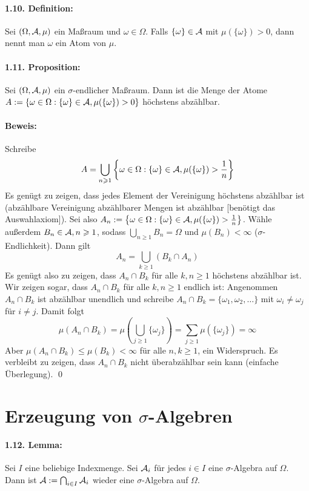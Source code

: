 \paragraph{1.10. Definition:}Sei $(\Omega,\mathcal{A},\mu)$ ein Ma\ss{}raum und $\omega\in\Omega$. Falls $\{\omega\}\in\mathcal{A}$ mit $\mu(\{\omega\})>0$, dann nennt man $\omega$ ein Atom von $\mu$.

\paragraph{1.11. Proposition:}Sei $(\Omega,\mathcal{A},\mu)$ ein $\sigma$-endlicher Ma\ss{}raum. Dann ist die Menge der Atome $A:=\{\omega\in\Omega:\{\omega\}\in\mathcal{A},\mu(\{\omega\})>0\}$ h\"ochstens abz\"ahlbar.

\paragraph{Beweis:}Schreibe
$$A=\bigcup_{n\geqslant1}\left\{\omega\in\Omega:\{\omega\}\in\mathcal{A},\mu(\{\omega\})>\frac{1}{n}\right\}$$
Es gen\"ugt zu zeigen, dass jedes Element der Vereinigung h\"ochstens abz\"ahlbar ist (abz\"ahlbare Vereinigung abz\"ahlbarer Mengen ist abz\"ahlbar [ben\"otigt das Auswahlaxiom]). Sei also $A_n:=\left\{\omega\in\Omega:\{\omega\}\in\mathcal{A},\mu(\{\omega\})>\frac{1}{n}\right\}$. W\"ahle au\ss{}erdem $B_n\in\mathcal{A},n\geqslant1$, sodass $\bigcup_{n\geq1}B_n=\Omega$ und $\mu(B_n)<\infty$ ($\sigma$-Endlichkeit). Dann gilt
$$A_n=\bigcup_{k\geq1}(B_k\cap A_n)$$
Es gen\"ugt also zu zeigen, dass $A_n\cap B_k$ f\"ur alle $k,n\geq1$ h\"ochstens abz\"ahlbar ist. Wir zeigen sogar, dass $A_n\cap B_k$ f\"ur alle $k,n\geq1$ endlich ist:\newline
 Angenommen $A_n\cap B_k$ ist abz\"ahlbar unendlich und schreibe $A_n\cap B_k=\{\omega_1,\omega_2,\hdots\}$ mit $\omega_i\neq\omega_j$ f\"ur $i\neq j$. Damit folgt
 $$\mu(A_n\cap B_k)=\mu\left(\bigcup_{j\geq1}\{\omega_j\}\right)=\sum_{j\geq1}\mu(\{\omega_j\})=\infty$$
Aber $\mu(A_n\cap B_k)\leq\mu(B_k)<\infty$ f\"ur alle $n,k\geq1$, ein Widerspruch. Es verbleibt zu zeigen, dass $A_n\cap B_k$ nicht \"uberabz\"ahlbar sein kann (einfache \"Uberlegung). \qed

\section*{Erzeugung von $\sigma$-Algebren}
\paragraph{1.12. Lemma:}Sei $I$ eine beliebige Indexmenge. Sei $\mathcal{A}_i$ f\"ur jedes $i\in I$ eine $\sigma$-Algebra auf $\Omega$. Dann ist $\mathcal{A}:=\bigcap_{i\in I}\mathcal{A}_i$ wieder eine $\sigma$-Algebra auf $\Omega$.

